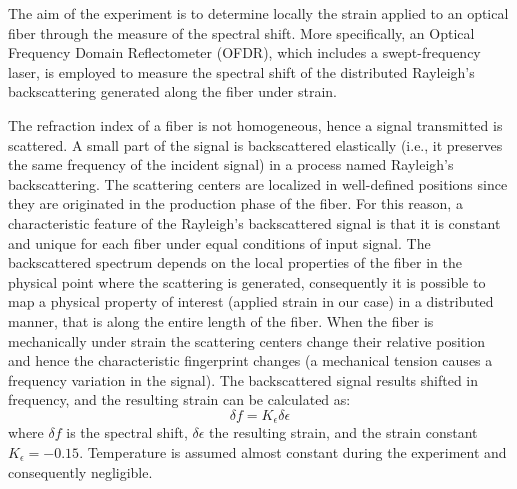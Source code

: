 The aim of the experiment is to determine locally the strain applied to an optical fiber through the measure of the spectral shift. More specifically, an Optical Frequency Domain Reflectometer (OFDR), which includes a swept-frequency laser, is employed to measure the spectral shift of the distributed Rayleigh's backscattering generated along the fiber under strain.

The refraction index of a fiber is not homogeneous, hence a signal transmitted is scattered. A small part of the signal is backscattered elastically (i.e., it preserves the same frequency of the incident signal) in a process named Rayleigh's backscattering. The scattering centers are localized in well-defined positions since they are originated in the production phase of the fiber. For this reason, a characteristic feature of the Rayleigh's backscattered signal is that it is constant and unique for each fiber under equal conditions of input signal.
The backscattered spectrum depends on the local properties of the fiber in the physical point where the scattering is generated, consequently it is possible to map a physical property of interest (applied strain in our case) in a distributed manner, that is along the entire length of the fiber.
When the fiber is mechanically under strain the scattering centers change their relative position and hence the characteristic fingerprint changes (a mechanical tension causes a frequency variation in the signal). The backscattered signal results shifted in frequency, and the resulting strain can be calculated as: $$\delta f = K_{\epsilon}\delta \epsilon$$ where $\delta f$ is the spectral shift, $\delta\epsilon$ the resulting strain, and the strain constant $ K_{\epsilon} = -0.15 $. Temperature is assumed almost constant during the experiment and consequently negligible.

